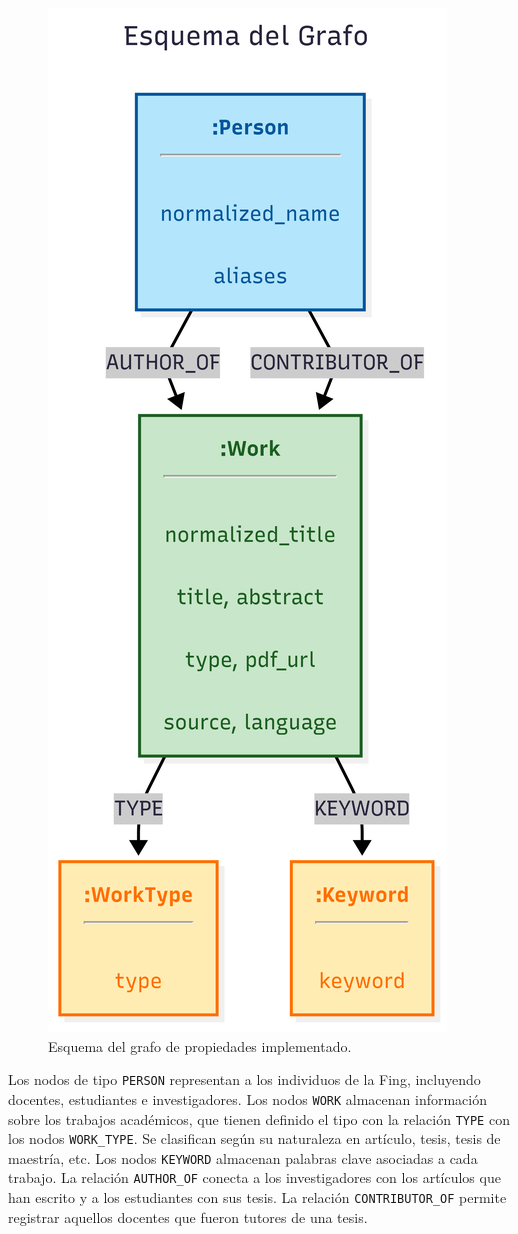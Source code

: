 \documentclass[journal]{IEEEtran}
\begin{document}
\begin{figure}[h]
	\centering
	\includegraphics[width=0.6\linewidth]{imagenes/grafo.png}
	\caption{Esquema del grafo de propiedades implementado.}
	\label{fig:grafo}
\end{figure}
Los nodos de tipo \texttt{PERSON} representan a los individuos de la Fing, incluyendo docentes, estudiantes e investigadores. Los nodos \texttt{WORK} almacenan información sobre los trabajos académicos, que tienen definido el tipo con la relación \texttt{TYPE} con los nodos \texttt{WORK\_TYPE}. Se clasifican según su naturaleza en artículo, tesis, tesis de maestría, etc. Los nodos \texttt{KEYWORD} almacenan palabras clave asociadas a cada trabajo.
La relación \texttt{AUTHOR\_OF} conecta a los investigadores con los artículos que han escrito y a los estudiantes con sus tesis. La relación \texttt{CONTRIBUTOR\_OF} permite registrar aquellos docentes que fueron tutores de una tesis.
\end{document}
